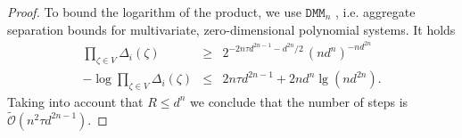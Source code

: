 \documentclass{sig-alternate}
\newcommand{\sO}{\ensuremath{\widetilde{\mathcal{O}}}\xspace}
\begin{document}
\begin{proof}
  To bound the logarithm of the product, we use $\texttt{DMM}_n$ \cite{emt-dmm-2009},
  i.e. aggregate separation bounds for multivariate, zero-di\-men\-sion\-al polynomial
  systems. It holds 
  \begin{displaymath}
    \begin{array}{lcl}
      \prod_{\zeta\in V}{\Delta_{i}(\zeta)} &\geq& 2^{-2n\tau d^{2n-1} - d^{2n}/2} \,  (nd^n)^{-n d^{2n}} \\
      -\log{ \prod_{\zeta\in V}{\Delta_{i}(\zeta)}} &\leq& 2n\tau d^{2n-1}  + 2 n  d^{n} \lg( n d^{2n}).
    \end{array}
  \end{displaymath}
  Taking into account that $R \leq d^n$ we conclude that the number of steps 
  is $\sO( n^2 \tau d^{2n-1})$.
\end{proof}
\end{document}
